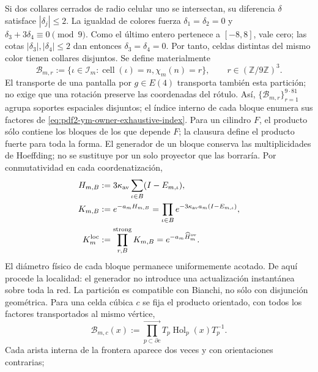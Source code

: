 Si dos collares cerrados de radio celular uno se intersectan, su diferencia
$\delta$ satisface $|\delta_j|\le2$. La igualdad de colores fuerza
$\delta_1=\delta_2=0$ y
$\delta_3+3\delta_4\equiv0\pmod9$. Como el último entero pertenece a
$[-8,8]$, vale cero; las cotas $|\delta_3|,|\delta_4|\le2$ dan entonces
$\delta_3=\delta_4=0$. Por tanto, celdas distintas del mismo color tienen
collares disjuntos. Se define materialmente
\begin{equation}\label{eq:pdf2-ym-owner-729-blocks}
 \mathcal B_{m,r}:=\{\iota\in\mathcal I_m:
   \operatorname{cell}(\iota)=n, \chi_m(n)=r\},
 \qquad r\in(\mathbb Z/9\mathbb Z)^3.
\end{equation}
El transporte de una pantalla por $g\in E(4)$ transporta también esta
partición; no exige que una rotación preserve las coordenadas del rótulo.
Así, $\{\mathcal B_{m,r}\}_{r=1}^{9\cdot81}$ agrupa soportes espaciales
disjuntos;
el índice interno de cada bloque enumera sus factores de
\eqref{eq:pdf2-ym-owner-exhaustive-index}. Para un cilindro $F$, el producto sólo
contiene los bloques de los que depende $F$; la clausura define el producto fuerte
para toda la forma. El generador de un bloque conserva las multiplicidades de
Hoeffding; no se sustituye por un solo proyector que las borraría. Por
conmutatividad en cada coordenatización,
\begin{equation}\label{eq:pdf2-ym-owner-local-circuit}
\begin{aligned}
 H_{m,B}&:=3\kappa_{\rm av}\sum_{\iota\in B}(I-E_{m,\iota}),\\
 K_{m,B}&:=e^{-a_mH_{m,B}}
 =\prod_{\iota\in B}e^{-3\kappa_{\rm av}a_m(I-E_{m,\iota})},\\
 K_m^{\rm loc}&:=\mathop{\prod_{r,B}}^{\rm strong}K_{m,B}
 =e^{-a_m\widehat H_m^{\rm ov}}.
\end{aligned}
\end{equation}
El diámetro físico de cada bloque permanece uniformemente acotado. De aquí procede
la localidad: el generador no introduce una actualización instantánea sobre toda la
red.
La partición es compatible con Bianchi, no sólo con disjunción geométrica. Para una
celda cúbica $c$ se fija el producto orientado, con todos los factores transportados
al mismo vértice,
\begin{equation}\label{eq:pdf2-ym-owner-bianchi-block-product}
 \mathscr B_{m,c}(x):=
 \prod_{p\subset\partial c}^{\longrightarrow}
 T_p\operatorname{Hol}_p(x)T_p^{-1}.
\end{equation}
Cada arista interna de la frontera aparece dos veces y con orientaciones contrarias;
